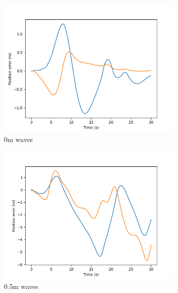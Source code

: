 \documentclass[class=article, crop=false]{standalone}
\begin{document}
\begin{figure}
    \centering
    \begin{subfigure}{0.65\textwidth}
        \centering
        \includegraphics{scenario1/rov-100m/0.0m/rov_position_error_controlled}
        \caption{0m waves}
    \end{subfigure}
    \vfill
    \begin{subfigure}{0.65\textwidth}
        \centering
        \includegraphics{scenario1/rov-100m/0.5m/rov_position_error_controlled}
        \caption{0.5m waves}
    \end{subfigure}
    \vfill
    \begin{subfigure}{0.65\textwidth}
        \centering

\end{subfigure}
\end{figure}
\end{document}
